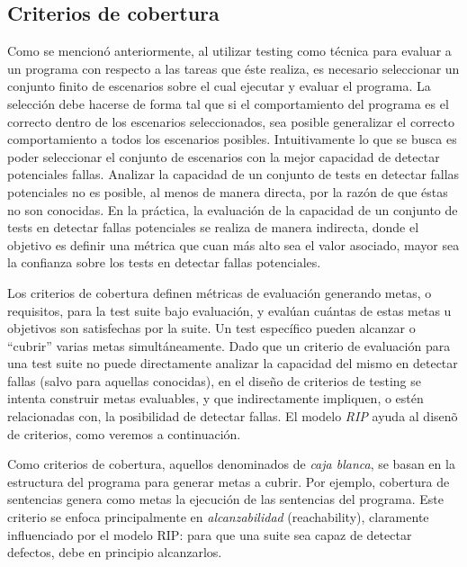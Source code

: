 \subsection{Criterios de cobertura}
\label{sec:preliminares.testing.covcriteria}


Como se mencion\'o anteriormente, al utilizar testing como t\'ecnica para evaluar a un programa con respecto a las tareas que \'este realiza, es necesario seleccionar un conjunto finito de escenarios sobre el cual ejecutar y evaluar el programa. La selecci\'on debe hacerse de forma tal que si el comportamiento del programa es el correcto dentro de los escenarios seleccionados, sea posible generalizar el correcto comportamiento a todos los escenarios posibles. Intuitivamente lo que se busca es poder seleccionar el conjunto de escenarios con la mejor capacidad de detectar potenciales fallas.
Analizar la capacidad de un conjunto de tests en detectar fallas potenciales no es posible, al menos de manera directa, por la raz\'on de que \'estas no son conocidas. En la pr\'actica, la evaluaci\'on de la capacidad de un conjunto de tests en detectar fallas potenciales se realiza de manera indirecta, donde el objetivo es definir una m\'etrica que cuan m\'as alto sea el valor asociado, mayor sea la confianza sobre los tests en detectar fallas potenciales.

Los criterios de cobertura definen m\'etricas de evaluaci\'on generando metas, o requisitos, para la test suite bajo evaluaci\'on, y eval\'uan cu\'antas de estas metas u objetivos son satisfechas por la suite. Un test espec\'ifico pueden alcanzar o ``cubrir'' varias metas simult\'aneamente. Dado que un criterio de evaluaci\'on para una test suite no puede directamente analizar la capacidad del mismo en detectar fallas (salvo para aquellas conocidas), en el dise\~no de criterios de testing se intenta construir metas evaluables, y que indirectamente impliquen, o est\'en relacionadas con, la posibilidad de detectar fallas. El modelo \emph{RIP} ayuda al disen\~o de criterios, como veremos a continuaci\'on.

Como criterios de cobertura, aquellos denominados de \emph{caja blanca}, se basan en la estructura del programa para generar metas a cubrir. Por ejemplo, cobertura de sentencias genera como metas la ejecuci\'on de las sentencias del programa. Este criterio se enfoca principalmente en \emph{alcanzabilidad} (reachability), claramente influenciado por el modelo RIP: para que una suite sea capaz de detectar defectos, debe en principio alcanzarlos. 

